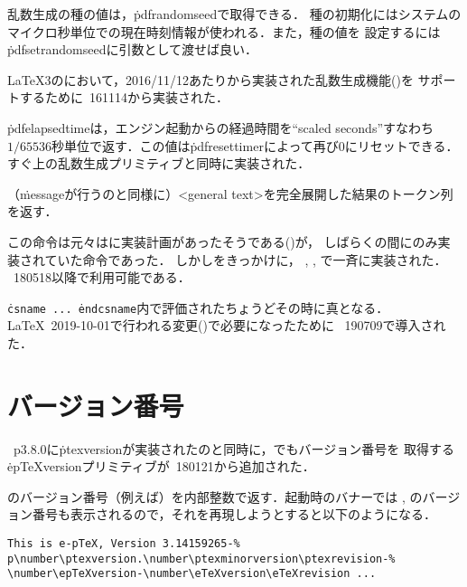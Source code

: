 \documentclass[a4paper,11pt,nomag]{jsarticle}
\begin{document}
\begin{cslist}
  乱数生成の種の値は，\.{pdfrandomseed}で取得できる．
  種の初期化にはシステムのマイクロ秒単位での現在時刻情報が使われる．また，種の値を
  設定するには\.{pdfsetrandomseed}に引数として渡せば良い．

  \LaTeX3のにおいて，2016/11/12あたりから実装された乱数生成機能(\cite{random})を
  サポートするために\epTeX~161114から実装された．

  \.{pdfelapsedtime}は，エンジン起動からの経過時間を``scaled seconds''すなわち
  $1/65536$秒単位で返す．この値は\.{pdfresettimer}によって再び0にリセットできる．
  すぐ上の乱数生成プリミティブと同時に実装された．

  （\.{message}が行うのと同様に）<general text>を完全展開した結果のトークン列を返す．

  この命令は元々はに実装計画があったそうである(\cite{expanded})が，
  しばらくの間にのみ実装されていた命令であった．
  しかし\cite{expanded1}をきっかけに，
  , \epTeX, で一斉に実装された．
  \epTeX~180518以降で利用可能である．

 \csitem[\.{ifincsname}]
  \texttt{\.{csname}~...~\.{endcsname}}内で評価されたちょうどその時に真となる．
  \LaTeX~2019-10-01で行われる変更(\cite{latex95,tjb83})で必要になったために
  \epTeX~190709で導入された．
\end{cslist}


\section{バージョン番号}
\pTeX~p3.8.0に\.{ptexversion}が実装されたのと同時に，\epTeX でもバージョン番号を
取得する\.{epTeXversion}プリミティブが\epTeX~180121から追加された．

\begin{cslist}
  \epTeX のバージョン番号（例えば\the\epTeXversion）を内部整数で返す．\epTeX 起動時のバナーでは
  \eTeX, \pTeX のバージョン番号も表示されるので，それを再現しようとすると以下のようになる．
\begin{verbatim}
This is e-pTeX, Version 3.14159265-%
p\number\ptexversion.\number\ptexminorversion\ptexrevision-%
\number\epTeXversion-\number\eTeXversion\eTeXrevision ...
\end{verbatim}
\end{cslist}
\end{document}
